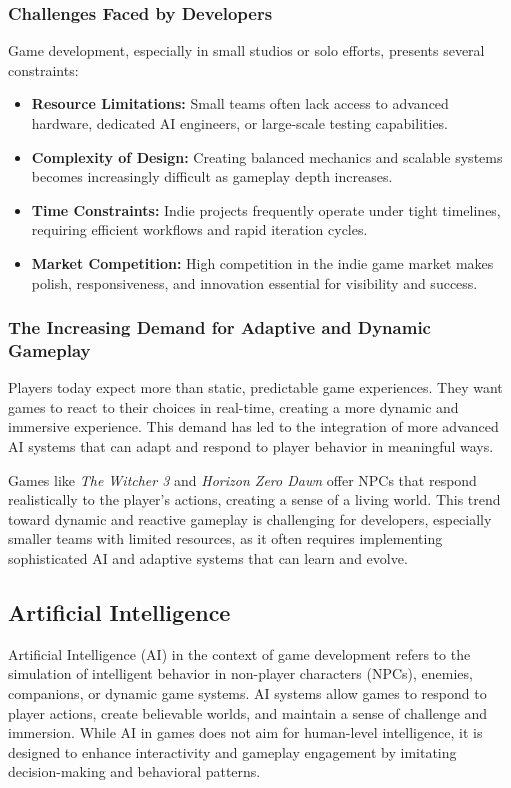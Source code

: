 \documentclass[12pt,oneside,openright,a4paper]{cpe-english-project}
\begin{document}
\subsubsection{Challenges Faced by Developers}
Game development, especially in small studios or solo efforts, presents several constraints:
\begin{itemize}
\item \textbf{Resource Limitations:} Small teams often lack access to advanced hardware, dedicated AI engineers, or large-scale testing capabilities.
\item \textbf{Complexity of Design:} Creating balanced mechanics and scalable systems becomes increasingly difficult as gameplay depth increases.
\item \textbf{Time Constraints:} Indie projects frequently operate under tight timelines, requiring efficient workflows and rapid iteration cycles.
\item \textbf{Market Competition:} High competition in the indie game market makes polish, responsiveness, and innovation essential for visibility and success.
\end{itemize}
\subsubsection{The Increasing Demand for Adaptive and Dynamic Gameplay}
Players today expect more than static, predictable game experiences. They want games to react to their choices in real-time, creating a more dynamic and immersive experience\cite{apnews_ai_npc}. This demand has led to the integration of more advanced AI systems that can adapt and respond to player behavior in meaningful ways.\par
Games like \emph{The Witcher 3}\cite{medium_witcher3_ai} and \emph{Horizon Zero Dawn}\cite{aiandgames_horizon} offer NPCs that respond realistically to the player’s actions, creating a sense of a living world. This trend toward dynamic and reactive gameplay is challenging for developers, especially smaller teams with limited resources, as it often requires implementing sophisticated AI and adaptive systems that can learn and evolve.

\subsection{Artificial Intelligence}

Artificial Intelligence (AI) in the context of game development refers to the simulation of intelligent behavior in non-player characters (NPCs), enemies, companions, or dynamic game systems\cite{fpgainsights_adaptive_ai}. AI systems allow games to respond to player actions, create believable worlds, and maintain a sense of challenge and immersion. While AI in games does not aim for human-level intelligence, it is designed to enhance interactivity and gameplay engagement by imitating decision-making and behavioral patterns.
\end{document}
